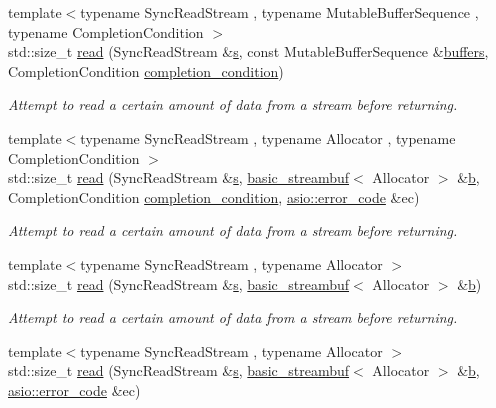 \begin{DoxyCompactItemize}
{\footnotesize template$<$typename Sync\+Read\+Stream , typename Mutable\+Buffer\+Sequence , typename Completion\+Condition $>$ }\\std\+::size\+\_\+t \hyperlink{group__read_ga3d689815cf77799d209397d92d0a2f79}{read} (Sync\+Read\+Stream \&\hyperlink{group__async__connect_ga31ab74b9ea6c77932dddd016cfc7920a}{s}, const Mutable\+Buffer\+Sequence \&\hyperlink{group__async__read_ga54dede45c3175148a77fe6635222c47d}{buffers}, Completion\+Condition \hyperlink{group__async__read_gae2e215d5013596cc2b385bb6c13fa518}{completion\+\_\+condition})
\begin{DoxyCompactList}\small\item\em Attempt to read a certain amount of data from a stream before returning. \end{DoxyCompactList}\item 
{\footnotesize template$<$typename Sync\+Read\+Stream , typename Allocator , typename Completion\+Condition $>$ }\\std\+::size\+\_\+t \hyperlink{group__read_ga6038b695e95ef357b104f35a28edfe3d}{read} (Sync\+Read\+Stream \&\hyperlink{group__async__connect_ga31ab74b9ea6c77932dddd016cfc7920a}{s}, \hyperlink{classasio_1_1basic__streambuf}{basic\+\_\+streambuf}$<$ Allocator $>$ \&\hyperlink{group__async__read_ga945a5c18fa77a9e2eba420f8f44b2a4f}{b}, Completion\+Condition \hyperlink{group__async__read_gae2e215d5013596cc2b385bb6c13fa518}{completion\+\_\+condition}, \hyperlink{classasio_1_1error__code}{asio\+::error\+\_\+code} \&ec)
\begin{DoxyCompactList}\small\item\em Attempt to read a certain amount of data from a stream before returning. \end{DoxyCompactList}\item 
{\footnotesize template$<$typename Sync\+Read\+Stream , typename Allocator $>$ }\\std\+::size\+\_\+t \hyperlink{group__read_gaaeda9d140628ff399cbe4a076cb15cee}{read} (Sync\+Read\+Stream \&\hyperlink{group__async__connect_ga31ab74b9ea6c77932dddd016cfc7920a}{s}, \hyperlink{classasio_1_1basic__streambuf}{basic\+\_\+streambuf}$<$ Allocator $>$ \&\hyperlink{group__async__read_ga945a5c18fa77a9e2eba420f8f44b2a4f}{b})
\begin{DoxyCompactList}\small\item\em Attempt to read a certain amount of data from a stream before returning. \end{DoxyCompactList}\item 
{\footnotesize template$<$typename Sync\+Read\+Stream , typename Allocator $>$ }\\std\+::size\+\_\+t \hyperlink{group__read_gabc0bc3183df1291c7b2a35ec30d5428c}{read} (Sync\+Read\+Stream \&\hyperlink{group__async__connect_ga31ab74b9ea6c77932dddd016cfc7920a}{s}, \hyperlink{classasio_1_1basic__streambuf}{basic\+\_\+streambuf}$<$ Allocator $>$ \&\hyperlink{group__async__read_ga945a5c18fa77a9e2eba420f8f44b2a4f}{b}, \hyperlink{classasio_1_1error__code}{asio\+::error\+\_\+code} \&ec)

\end{DoxyCompactItemize}

